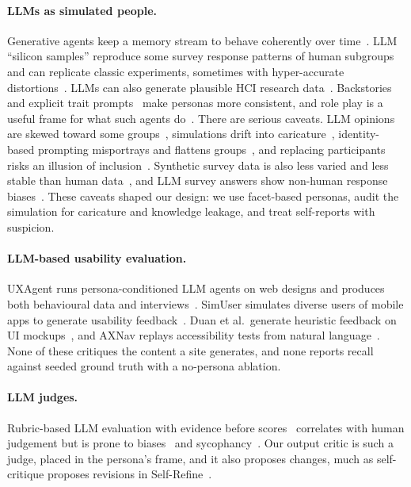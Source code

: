 \documentclass[10pt,twocolumn]{article}
\begin{document}
\paragraph{LLMs as simulated people.} Generative agents keep a memory stream to behave coherently over time~\cite{park2023generative}. LLM ``silicon samples'' reproduce some survey response patterns of human subgroups~\cite{argyle2023out} and can replicate classic experiments, sometimes with hyper-accurate distortions~\cite{aher2023using}. LLMs can also generate plausible HCI research data~\cite{hamalainen2023evaluating}. Backstories~\cite{moon2024virtual} and explicit trait prompts~\cite{jiang2024personallm,serapio2023personality} make personas more consistent, and role play is a useful frame for what such agents do~\cite{shanahan2023role}. There are serious caveats. LLM opinions are skewed toward some groups~\cite{santurkar2023whose}, simulations drift into caricature~\cite{cheng2023compost}, identity-based prompting misportrays and flattens groups~\cite{wang2025large}, and replacing participants risks an illusion of inclusion~\cite{agnew2024illusion}. Synthetic survey data is also less varied and less stable than human data~\cite{bisbee2024synthetic}, and LLM survey answers show non-human response biases~\cite{tjuatja2024llms,dominguez2024questioning}. These caveats shaped our design: we use facet-based personas, audit the simulation for caricature and knowledge leakage, and treat self-reports with suspicion.

\paragraph{LLM-based usability evaluation.} UXAgent runs persona-conditioned LLM agents on web designs and produces both behavioural data and interviews~\cite{lu2025uxagent}. SimUser simulates diverse users of mobile apps to generate usability feedback~\cite{xiang2024simuser}. Duan et al.\ generate heuristic feedback on UI mockups~\cite{duan2024generating}, and AXNav replays accessibility tests from natural language~\cite{taeb2024axnav}. None of these critiques the content a site generates, and none reports recall against seeded ground truth with a no-persona ablation.

\paragraph{LLM judges.} Rubric-based LLM evaluation with evidence before scores~\cite{liu2023geval,kim2024prometheus} correlates with human judgement but is prone to biases~\cite{zheng2023judging} and sycophancy~\cite{sharma2024sycophancy}. Our output critic is such a judge, placed in the persona's frame, and it also proposes changes, much as self-critique proposes revisions in Self-Refine~\cite{madaan2023selfrefine}.
\end{document}
